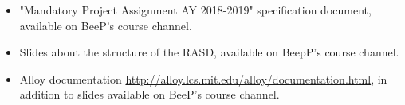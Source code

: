 
%

\begin{itemize}
\item "Mandatory Project Assignment AY 2018-2019" specification document, available on BeeP's course channel.
\item Slides about the structure of the RASD, available on BeepP's course channel.
\item Alloy documentation \url{http://alloy.lcs.mit.edu/alloy/documentation.html}, in addition to slides available on BeeP's course channel.
\end{itemize}

%